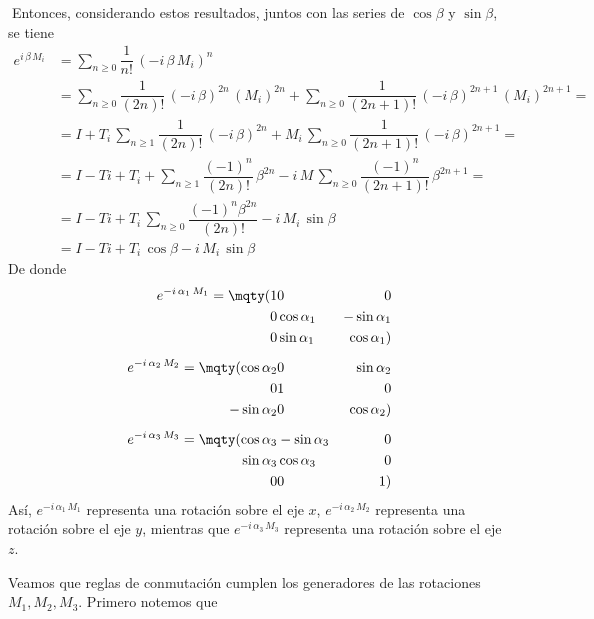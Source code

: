 Entonces, considerando estos resultados, juntos con las series de $\cos \beta$ y $\sin \beta$, se tiene
\begin{align}
e^{i \, \beta \, M_{i}} &= \sum_{n \geq 0} \dfrac{1}{n!} \, (- i \, \beta \, M_{i})^{n} \nonumber \\[0.5em]
&= \sum_{n \geq 0} \dfrac{1}{(2 n)!} \, (- i \, \beta)^{2 n} \, (M_{i})^{2 n} + \sum_{n \geq 0} \dfrac{1}{(2 n +1)!} \, (- i \, \beta)^{2 n + 1} \, (M_{i})^{2 n + 1} = \nonumber \\[0.5em]
&= I + T_{i} \, \sum_{n \geq 1} \dfrac{1}{(2 n)!} \, (- i \, \beta)^{2 n} + M_{i} \, \sum_{n \geq 0} \dfrac{1}{(2 n +1)!} \, (- i \, \beta)^{2 n + 1} = \nonumber \\[0.5em]
&= I - T{i} + T_{i} + \sum_{n \geq 1} \dfrac{(-1)^{n}}{(2 n)!} \, \beta^{2 n} - i \, M \, \sum_{n \geq 0} \dfrac{(-1)^{n}}{(2 n +1)!} \, \beta^{2 n + 1} = \nonumber \\[0.5em]
&= I - T{i} + T_{i} \, \sum_{n \geq 0} \dfrac{(-1)^{n} \beta^{2 n}}{(2 n)!} - i \, M_{i} \, \sin \beta \nonumber \\[0.5em]
&= I - T{i} + T_{i} \, \cos \beta - i \, M_{i} \, \sin \beta \label{eq:ecuacion_10_079}
\end{align}
De donde
\begin{align}
\begin{aligned}
e^{-i \, \alpha_{1} \, M_{1}} = \mqty(1 & 0 & 0 \\ 0 & \cos \alpha_{1} & - \sin \alpha_{1} \\ 0 & \sin \alpha_{1} & \cos \alpha_{1}) \\[0.5em]
e^{-i \, \alpha_{2} \, M_{2}} = \mqty(\cos \alpha_{2} & 0 & \sin \alpha_{2} \\ 0 & 1 & 0 \\ - \sin \alpha_{2} & 0 & \cos \alpha_{2}) \\[0.5em]
e^{-i \, \alpha_{3} \, M_{3}} = \mqty(\cos \alpha_{3} & - \sin \alpha_{3} & 0 \\ \sin \alpha_{3} & \cos \alpha_{3} & 0 \\ 0 & 0 & 1)
\end{aligned}
\label{eq:ecuacion_10_080}
\end{align}
Así, $e^{-i \, \alpha_{1} \, M_{1}}$ representa una rotación sobre el eje $x$, $e^{-i \, \alpha_{2} \, M_{2}}$ representa una rotación sobre el eje $y$, mientras que $e^{-i \, \alpha_{3} \, M_{3}}$ representa una rotación sobre el eje $z$.
\par
Veamos que reglas de conmutación cumplen los generadores de las rotaciones $M_{1}, M_{2}, M_{3}$. Primero notemos que

